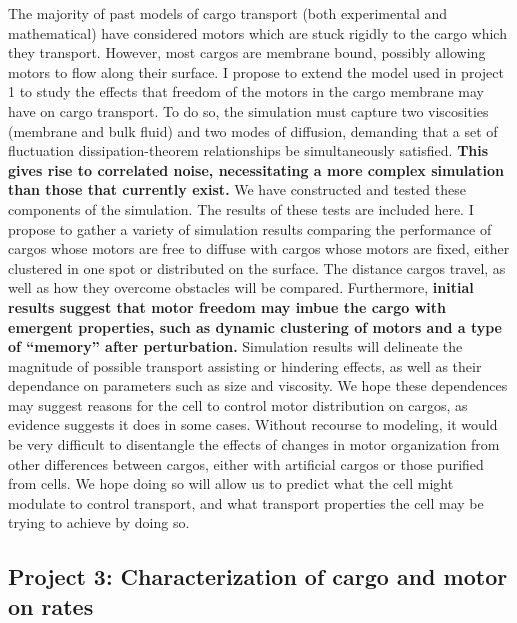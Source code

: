 {The majority of past models of cargo transport (both experimental and mathematical) have considered motors which are stuck rigidly to the cargo which they transport. However, most cargos are membrane bound, possibly allowing motors to flow along their surface. I propose to extend the model used in project 1 to study the effects that freedom of the motors in the cargo membrane may have on cargo transport. To do so, the simulation must capture two viscosities (membrane and bulk fluid) and two modes of diffusion, demanding that a set of fluctuation dissipation-theorem relationships be simultaneously satisfied. \textbf{This gives rise to correlated noise, necessitating a more complex simulation than those that currently exist.} We have constructed and tested these components of the simulation. The results of these tests are included here. I propose to gather a variety of simulation results comparing the performance of cargos whose motors are free to diffuse with cargos whose motors are fixed, either clustered in one spot or distributed on the surface. The distance cargos travel, as well as how they overcome obstacles will be compared. Furthermore, \textbf{initial results suggest that motor freedom may imbue the cargo with emergent properties, such as dynamic clustering of motors and a type of ``memory'' after perturbation.} Simulation results will delineate the magnitude of possible transport assisting or hindering effects, as well as their dependance on parameters such as size and viscosity. We hope these dependences may suggest reasons for the cell to control motor distribution on cargos, as evidence suggests it does in some cases. Without recourse to modeling, it would be very difficult to disentangle the effects of changes in motor organization from other differences between cargos, either with artificial cargos or those purified from cells. We hope doing so will allow us to predict what the cell might modulate to control transport, and what transport properties the cell may be trying to achieve by doing so.

\subsection*{Project 3: Characterization of cargo and motor on rates}

}

